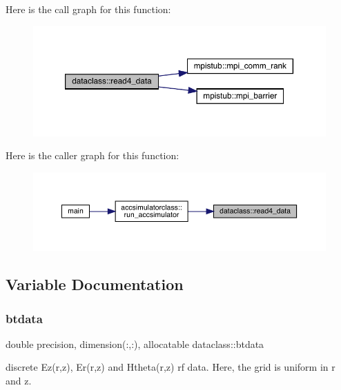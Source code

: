 Here is the call graph for this function\+:\nopagebreak
\begin{figure}[H]
\begin{center}
\leavevmode
\includegraphics[width=350pt]{namespacedataclass_a2ef1f00ff4295094270a70c5d3763019_cgraph}
\end{center}
\end{figure}
Here is the caller graph for this function\+:\nopagebreak
\begin{figure}[H]
\begin{center}
\leavevmode
\includegraphics[width=350pt]{namespacedataclass_a2ef1f00ff4295094270a70c5d3763019_icgraph}
\end{center}
\end{figure}


\subsection{Variable Documentation}
\mbox{\label{namespacedataclass_a09d27eeab42c3e3369268d8ce133a2c0}} 
\subsubsection{\texorpdfstring{btdata}{btdata}}
{\footnotesize\ttfamily double precision, dimension(\+:,\+:), allocatable dataclass\+::btdata}



discrete Ez(r,z), Er(r,z) and Htheta(r,z) rf data. Here, the grid is uniform in r and z. 

\mbox{\label{namespacedataclass_ad10657f6c8e764ba3c355bd0e2c98a01}} 
